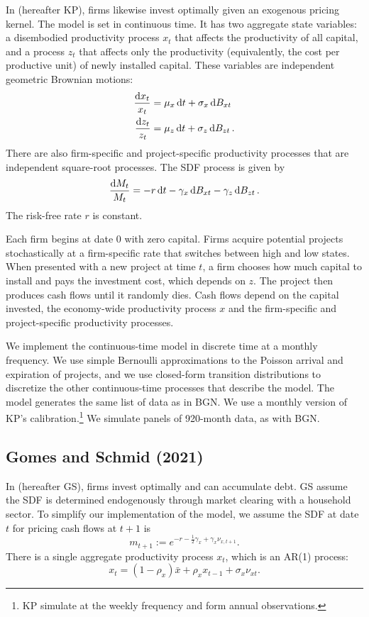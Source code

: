 \documentclass[12pt]{scrarticle}
\begin{document}
In \cite{kp_2014} (hereafter KP), firms likewise invest optimally given an exogenous pricing kernel. 
The model is set in continuous time.  It has two aggregate state variables: a disembodied productivity process $x_t$ that affects the productivity of all capital, and a process $z_t$ that affects only the productivity (equivalently, the cost per productive unit) of newly installed capital. These variables are independent geometric Brownian motions:
\begin{align*}
\frac{\mathrm{d} x_t}{x_t} &= \mu_x  \,\mathrm{d} t + \sigma_x  \,\mathrm{d} B_{xt} \\
\frac{\mathrm{d} z_t}{z_t} &= \mu_z \,\mathrm{d} t + \sigma_z \,\mathrm{d} B_{zt}\,.
\end{align*}
There are also firm-specific and project-specific productivity processes that are independent square-root processes.  The SDF process is given by 
\[
\frac{\mathrm{d} M_t}{M_t} = -r \,\mathrm{d} t - \gamma_x \,\mathrm{d} B_{xt} - \gamma_z \,\mathrm{d} B_{zt}\,.
\]
The risk-free rate $r$ is constant.

Each firm begins at date 0 with zero capital. Firms acquire potential projects stochastically at a firm-specific rate that switches between high and low states. When presented with a new project at time $t$, a firm chooses how much capital to install and pays the investment cost, which depends on $z$. The project then produces cash flows until it randomly dies.  Cash flows depend on the capital invested, the economy-wide productivity process $x$ and the firm-specific and project-specific productivity processes.  

We implement the continuous-time model in discrete time at a monthly frequency. We use simple Bernoulli approximations to the Poisson arrival and expiration of projects, and we use closed-form transition distributions to discretize the other continuous-time processes that describe the model. 
The model generates the same list of data as in BGN. We use a monthly version of KP's calibration.\footnote{KP simulate at the weekly frequency and form annual observations.} We simulate \numpanels panels of 920-month data, as with BGN.

\subsection{Gomes and Schmid (2021)}

In \cite{GS21} (hereafter GS), firms invest optimally and can accumulate debt. GS assume the SDF is determined endogenously through market clearing with a household sector. To simplify our implementation of the model, we assume the SDF at date $t$ for pricing cash flows at $t+1$ is \[
m_{t+1} := e^{-r - \frac{1}{2} \gamma_x + \gamma_x \nu_{x,t+1}}.
\]
There is a single aggregate productivity process $x_t$, which is an AR(1) process:
\[
x_t = (1 - \rho_x) \bar{x} + \rho_x x_{t-1} + \sigma_x \nu_{xt}.
\]
\end{document}

